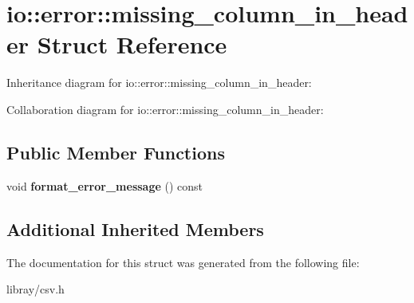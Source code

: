 \hypertarget{structio_1_1error_1_1missing__column__in__header}{}\section{io\+:\+:error\+:\+:missing\+\_\+column\+\_\+in\+\_\+header Struct Reference}
\label{structio_1_1error_1_1missing__column__in__header}


Inheritance diagram for io\+:\+:error\+:\+:missing\+\_\+column\+\_\+in\+\_\+header\+:


Collaboration diagram for io\+:\+:error\+:\+:missing\+\_\+column\+\_\+in\+\_\+header\+:
\subsection*{Public Member Functions}
\begin{DoxyCompactItemize}
\item 
\mbox{\label{structio_1_1error_1_1missing__column__in__header_a1a2bd4e01a389cb50c6bfae8443317fd}} 
void {\bfseries format\+\_\+error\+\_\+message} () const
\end{DoxyCompactItemize}
\subsection*{Additional Inherited Members}


The documentation for this struct was generated from the following file\+:\begin{DoxyCompactItemize}
\item 
libray/csv.\+h\end{DoxyCompactItemize}
